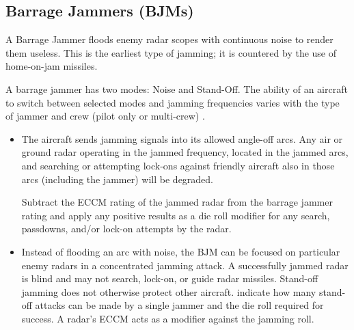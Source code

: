 
\subsection{Barrage Jammers (BJMs)}


A Barrage Jammer floods enemy radar scopes with continuous noise to render them useless. This is the earliest type of jamming; it is countered by the use of home-on-jam missiles.

A barrage jammer has two modes: Noise and Stand-Off. The ability of an aircraft to switch between selected modes and jamming frequencies varies with the type of jammer and crew (pilot only or multi-crew) . 

\begin{itemize}

    \item {} The aircraft sends jamming signals into its allowed angle-off arcs. Any air or ground radar operating in the jammed frequency, located in the jammed arcs, and searching or attempting lock-ons against friendly aircraft also in those arcs (including the jammer) will be degraded.

    Subtract the ECCM rating of the jammed radar from the barrage jammer rating and apply any positive results as a die roll modifier for any search, passdowns, and/or lock-on attempts by the radar.

    \item {} Instead of flooding an arc with noise, the BJM can be focused on particular enemy radars in a concentrated jamming attack. A successfully jammed radar is blind and may not search, lock-on, or guide radar missiles. Stand-off jamming does not otherwise protect other aircraft.  indicate how many stand-off attacks can be made by a single jammer and the die roll required for success. A radar's ECCM acts as a modifier against the jamming roll.
    
\end{itemize}

